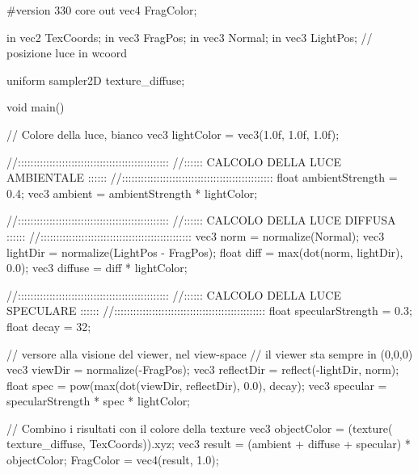\begin{cpp}[caption={Codice sorgente del Fragment shader che implementa l'illuminazione di Phong.}, captionpos=t]
#version 330 core
out vec4 FragColor;

in vec2 TexCoords;
in vec3 FragPos;
in vec3 Normal;
in vec3 LightPos;   // posizione luce in wcoord

uniform sampler2D texture_diffuse;

void main()
{
	// Colore della luce, bianco
	vec3 lightColor = vec3(1.0f, 1.0f, 1.0f);
	
	//::::::::::::::::::::::::::::::::::::::::::::::::
	//::::::  CALCOLO DELLA LUCE AMBIENTALE     :::::: 
	//::::::::::::::::::::::::::::::::::::::::::::::::
	float ambientStrength = 0.4;
	vec3 ambient = ambientStrength * lightColor;    
	
	
	//::::::::::::::::::::::::::::::::::::::::::::::::
	//::::::  CALCOLO DELLA LUCE DIFFUSA        :::::: 
	//::::::::::::::::::::::::::::::::::::::::::::::::
	vec3 norm = normalize(Normal);
	vec3 lightDir = normalize(LightPos - FragPos);
	float diff = max(dot(norm, lightDir), 0.0);
	vec3 diffuse = diff * lightColor;
	
	//::::::::::::::::::::::::::::::::::::::::::::::::
	//::::::  CALCOLO DELLA LUCE SPECULARE      :::::: 
	//::::::::::::::::::::::::::::::::::::::::::::::::
	float specularStrength = 0.3;
	float decay = 32;
	
	// versore alla visione del viewer, nel  view-space
	// il viewer sta sempre in (0,0,0)
	vec3 viewDir = normalize(-FragPos); 
	vec3 reflectDir = reflect(-lightDir, norm);  
	float spec = pow(max(dot(viewDir, reflectDir), 0.0), decay);
	vec3 specular = specularStrength * spec * lightColor; 
	
	
	// Combino i risultati con il colore della texture
	vec3 objectColor = (texture( texture_diffuse, TexCoords)).xyz;
	vec3 result = (ambient + diffuse + specular) * objectColor;
	FragColor = vec4(result, 1.0);
}
\end{cpp}